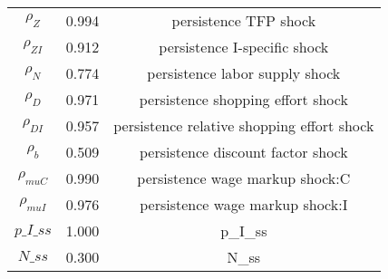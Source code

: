 \begin{center}
\begin{longtable}{ccc}
${\rho_Z}$ 	 & 	 0.994 	 & 	 persistence TFP shock\\
${\rho_{ZI}}$ 	 & 	 0.912 	 & 	 persistence I-specific shock\\
${\rho_N}$ 	 & 	 0.774 	 & 	 persistence labor supply shock\\
${\rho_D}$ 	 & 	 0.971 	 & 	 persistence shopping effort shock\\
${\rho_{DI}}$ 	 & 	 0.957 	 & 	 persistence relative shopping effort shock\\
${\rho_b}$ 	 & 	 0.509 	 & 	 persistence discount factor shock\\
${\rho_{muC}}$ 	 & 	 0.990 	 & 	 persistence wage markup shock:C\\
${\rho_{muI}}$ 	 & 	 0.976 	 & 	 persistence wage markup shock:I\\
$p\_I\_ss$ 	 & 	 1.000 	 & 	 p\_I\_ss\\
$N\_ss$ 	 & 	 0.300 	 & 	 N\_ss\\
\bottomrule%
\end{longtable}
\end{center}

